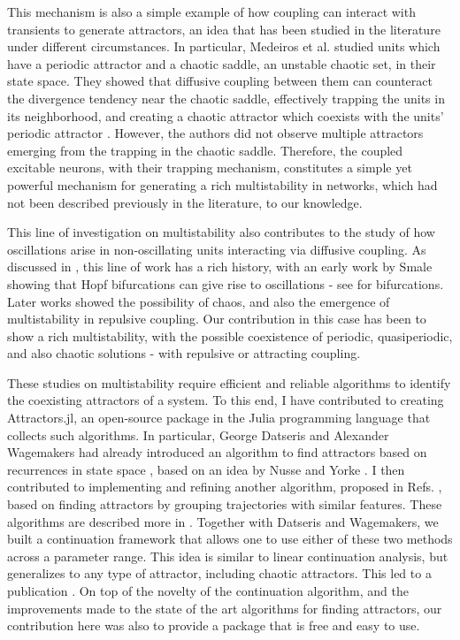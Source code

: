 This mechanism is also a simple example of how coupling can interact with transients to generate attractors, an idea that has been studied in the literature under different circumstances. In particular, Medeiros et al. studied units which have a periodic attractor and a chaotic saddle, an unstable chaotic set, in their state space. They showed that diffusive coupling between them can counteract the divergence tendency near the chaotic saddle, effectively trapping the units in its neighborhood, and creating a chaotic attractor which coexists with the units' periodic attractor \cite{medeiros2018boundaries, medeiros2019state}. However, the authors did not observe multiple attractors emerging from the trapping in the chaotic saddle. Therefore, the coupled excitable neurons, with their trapping mechanism, constitutes a simple yet powerful mechanism for generating a rich multistability in networks, which had not been described previously in the literature, to our knowledge.

This line of investigation on multistability also contributes to the study of how oscillations arise in non-oscillating units interacting via diffusive coupling. As discussed in , this line of work has a rich history, with an early work by Smale showing that Hopf bifurcations can give rise to oscillations \cite{smale1976a} - see  for bifurcations. Later works showed the possibility of chaos, and also the emergence of multistability in repulsive coupling. Our contribution in this case has been to show a rich multistability, with the possible coexistence of periodic, quasiperiodic, and also chaotic solutions - with repulsive or attracting coupling. 

These studies on multistability require efficient and reliable algorithms to identify the coexisting attractors of a system. To this end, I have contributed to creating Attractors.jl, an open-source package in the Julia programming language that collects such algorithms. In particular, George Datseris and Alexander Wagemakers had already introduced an algorithm to find attractors based on recurrences in state space \cite{datseris2022effortless}, based on an idea by Nusse and Yorke \cite{nusse1994dynamics}. I then contributed to implementing and refining another algorithm, proposed in Refs. \cite{stender2021bstab, gelbrecht2020monte}, based on finding attractors by grouping trajectories with similar features. These algorithms are described more in . Together with Datseris and Wagemakers, we built a continuation framework that allows one to use either of these two methods across a parameter range. This idea is similar to linear continuation analysis, but generalizes to any type of attractor, including chaotic attractors. This led to a publication \cite{datseris2023framework}. On top of the novelty of the continuation algorithm, and the improvements made to the state of the art algorithms for finding attractors, our contribution here was also to provide a package that is free and easy to use. 

